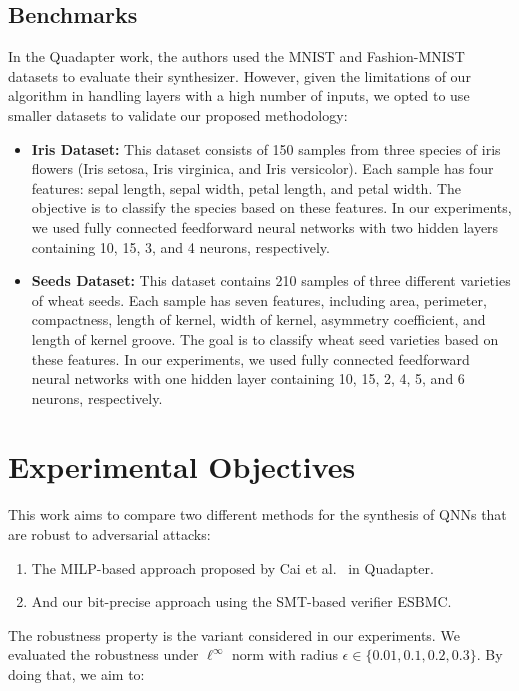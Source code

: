 \subsection{Benchmarks}

In the Quadapter work, the authors used the MNIST and Fashion-MNIST datasets to evaluate their synthesizer. However, given the limitations of our algorithm in handling layers with a high number of inputs, we opted to use smaller datasets to validate our proposed methodology:

\begin{itemize}
    \item \textbf{Iris Dataset:} This dataset consists of 150 samples from three species of iris flowers (Iris setosa, Iris virginica, and Iris versicolor). Each sample has four features: sepal length, sepal width, petal length, and petal width. The objective is to classify the species based on these features. In our experiments, we used fully connected feedforward neural networks with two hidden layers containing 10, 15, 3, and 4 neurons, respectively.
    \item \textbf{Seeds Dataset:} This dataset contains 210 samples of three different varieties of wheat seeds. Each sample has seven features, including area, perimeter, compactness, length of kernel, width of kernel, asymmetry coefficient, and length of kernel groove. The goal is to classify wheat seed varieties based on these features. In our experiments, we used fully connected feedforward neural networks with one hidden layer containing 10, 15, 2, 4, 5, and 6 neurons, respectively. 
\end{itemize}

\section{Experimental Objectives}

This work aims to compare two different methods for the synthesis of QNNs that are robust to adversarial attacks:

\begin{enumerate}
    \item The MILP-based approach proposed by Cai et al.~\cite{cai2025certified} in Quadapter.
    \item And our bit-precise approach using the SMT-based verifier ESBMC.
\end{enumerate}

The robustness property is the variant considered in our experiments. We evaluated the robustness under $\ell^\infty$ norm with radius $\epsilon \in \{0.01, 0.1, 0.2, 0.3\}$. By doing that, we aim to:


